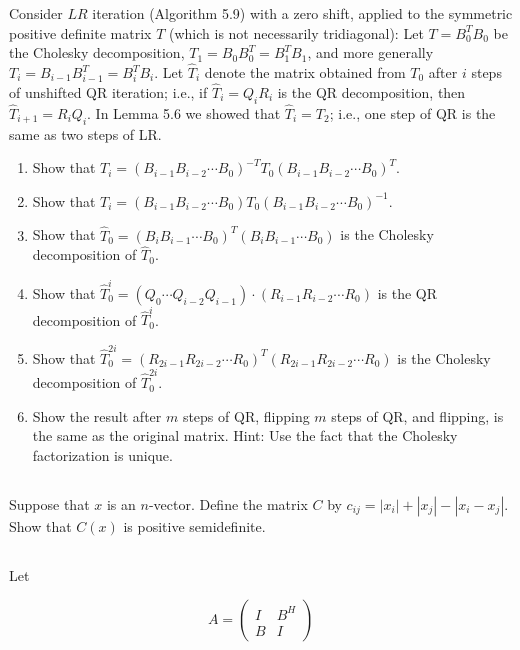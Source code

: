 \documentclass[a4paper]{ctexart}
\newcommand{\pf}{\textbf{\color{pink}{proof:}}}
\begin{document}
Consider $LR$ iteration (Algorithm 5.9) with a zero shift, applied to the symmetric positive definite matrix $T$ (which is not necessarily tridiagonal): Let $T = B_0^TB_0$ be the Cholesky decomposition, $T_1 = B_0B_0^T = B_1^TB_1$, and more generally $T_i = B_{i-1}B_{i-1}^T = B_i^TB_i$. Let $\hat{T}_i$ denote the matrix obtained from $T_0$ after $i$ steps of unshifted QR iteration; i.e., if $\hat{T}_i = Q_iR_i$ is the QR decomposition, then $\hat{T}_{i+1} = R_iQ_i$. In Lemma 5.6 we showed that $\hat{T}_i = T_2$; i.e., one step of QR is the same as two steps of LR.
\begin{enumerate}
    \item Show that $T_i = (B_{i-1}B_{i-2}\cdots B_0)^{-T}T_0(B_{i-1}B_{i-2}\cdots B_0)^T$.
    \item Show that $T_i = (B_{i-1}B_{i-2}\cdots B_0)T_0(B_{i-1}B_{i-2}\cdots B_0)^{-1}$.
    \item Show that $\hat{T}_0 = (B_iB_{i-1}\cdots B_0)^T(B_iB_{i-1}\cdots B_0)$ is the Cholesky decomposition of $\hat{T}_0$.
    \item Show that $\hat{T}^i_0 = (Q_0 \cdots Q_{i-2}Q_{i-1}) \cdot (R_{i-1}R_{i-2}\cdots R_0)$ is the QR decomposition of $\hat{T}^i_0$.
    \item Show that $\hat{T}^{2i}_0 = (R_{2i-1}R_{2i-2}\cdots R_0)^T(R_{2i-1}R_{2i-2}\cdots R_0)$ is the Cholesky decomposition of $\hat{T}^{2i}_0$.
    \item Show the result after $m$ steps of QR, flipping $m$ steps of QR, and flipping, is the same as the original matrix. Hint: Use the fact that the Cholesky factorization is unique.
\end{enumerate}

\pf

\subsection{}
Suppose that $x$ is an $n$-vector. Define the matrix $C$ by $c_{ij} = |x_i| + |x_j| - |x_i - x_j|$. Show that $C(x)$ is positive semidefinite.

\pf

\subsection{}
Let 

\[
A = \begin{pmatrix}
I & B^H \\
B & I
\end{pmatrix}
\]
\end{document}
